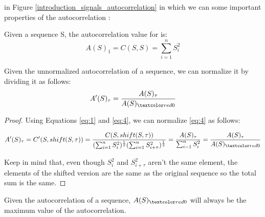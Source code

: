  in Figure
\ref{introduction_signals_autocorrelation} in which we can  
some important properties of the autocorrelation :

\begin{theorem}\label{theorem:1.2.1}
  Given a sequence S, the autocorrelation value for  is:
    \begin{equation}
      A(S)_{1}=C(S, S)=\sum_{i=1}^{n}S_{i}^2
    \end{equation}
\end{theorem}

\begin{corollary}
  Given the unnormalized autocorrelation of a sequence, we can
  normalize it by dividing it as follows:
  \begin{equation}
    A'(S)_{\tau} = \frac{A(S)_{\tau}}{A(S)_{\domingo{0}}}
  \end{equation}
\end{corollary}

\begin{proof}
  Using Equations \ref{eq:1} and \ref{eq:4}, we can normalize \ref{eq:4} as
  follows:

    $$A'(S)_{\tau} = C'(S, shift(S, \tau)) = \frac{C(S, shift(S, \tau))}{(\sum_{i=1}^{n} S_{i}^{2})^{\frac{1}{2}}(\sum_{i=1}^{n} S_{i+\tau}^{2})^\frac{1}{2}} = \frac{A(S)_{\tau}}{\sum_{i=1}^{n} S_{i}^{2}} = \frac{A(S)_{\tau}}{A(S)_{\domingo{0}}}$$

  Keep in mind that, even though $S_{i}^2$ and $S_{i+\tau}^2$ aren't the same element, the elements of the shifted version are the same as the original sequence so the total sum is the same.
\end{proof}

\begin{corollary}\label{autocorrelation:coro:1}
  Given the autocorrelation of a sequence, $A(S)_{\domingo{0}}$ will always be the maximum value of the autocorrelation.
\end{corollary}









